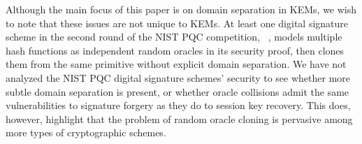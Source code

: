 
Although the main focus of this paper is on domain separation in KEMs, we wish to note that these issues are not unique to KEMs.
At least one digital signature scheme in the second round of the NIST PQC competition, ~\cite{nistpqc:MQDSS}, models multiple hash functions as independent random oracles in its security proof, then clones them from the same primitive without explicit domain separation.
We have not analyzed the NIST PQC digital signature schemes' security to see whether more subtle domain separation is present, or whether oracle collisions admit the same vulnerabilities to signature forgery as they do to session key recovery.
This does, however, highlight that the problem of random oracle cloning is pervasive among more types of cryptographic schemes.%





